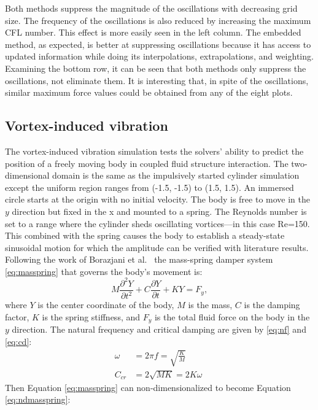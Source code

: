 \documentclass[preprint,12pt]{elsarticle}
\begin{document}
Both methods suppress the magnitude of the oscillations with decreasing grid size. 
The frequency of the oscillations is also reduced by increasing the maximum CFL number. 
This effect is more easily seen in the left column. 
The embedded method, as expected, is better at suppressing oscillations because it has access to updated information while doing its interpolations, extrapolations, and weighting.  
Examining the bottom row, it can be seen that both methods only suppress the oscillations, not eliminate them. 
It is interesting that, in spite of the oscillations, similar maximum force values could be obtained from any of the eight plots. 

\subsection{Vortex-induced vibration}
The vortex-induced vibration simulation tests the solvers' ability to predict the position of a freely moving body in coupled fluid structure interaction. 
The two-dimensional domain is the same as the impulsively started cylinder simulation except the uniform region ranges from (-1.5, -1.5) to (1.5, 1.5). 
An immersed circle starts at the origin with no initial velocity. 
The body is free to move in the $y$ direction but fixed in the x and mounted to a spring. 
The Reynolds number is set to a range where the cylinder sheds oscillating vortices---in this case Re=150. 
This combined with the spring causes the body to establish a steady-state sinusoidal motion for which the amplitude can be verified with literature results. 
Following the work of Borazjani et al.~\cite{borazjani2008curvilinear} the mass-spring damper system \eqref{eq:masspring} that governs the body's movement is:
\begin{equation}
M\frac{\partial^2Y}{\partial t^2}+C\frac{\partial Y}{\partial t}+KY=F_y, \label{eq:masspring}
\end{equation}
where $Y$ is the center coordinate of the body, $M$ is the mass, $C$ is the damping factor, $K$ is the spring stiffness, and $F_y$ is the total fluid force on the body in the $y$ direction. 
The natural frequency and critical damping are given by \eqref{eq:nf} and \eqref{eq:cd}: 
\begin{align}
\omega &=2\pi f =\sqrt{\frac{K}{M}}\label{eq:nf}\\
C_{cr}&=2\sqrt{MK}=2K\omega \; \label{eq:cd}
\end{align}
Then Equation \eqref{eq:masspring} can non-dimensionalized to become Equation \eqref{eq:ndmasspring}:
\end{document}
